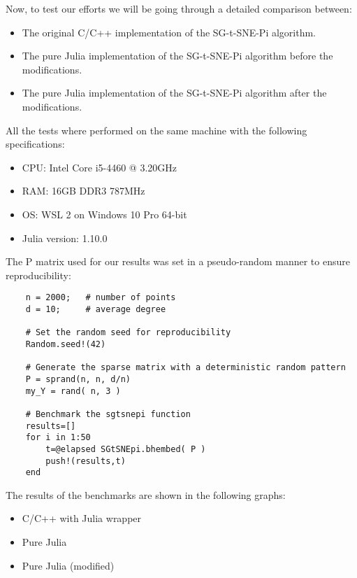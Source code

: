 Now, to test our efforts we will be going through a detailed comparison between:
\begin{itemize}
    \item The original C/C++ implementation of the SG-t-SNE-Pi algorithm.
    \item The pure Julia implementation of the SG-t-SNE-Pi algorithm before the modifications.
    \item The pure Julia implementation of the SG-t-SNE-Pi algorithm after the modifications.
\end{itemize}
All the tests where performed on the same machine with the following specifications:
\begin{itemize}
    \item CPU: Intel Core i5-4460 @ 3.20GHz
    \item RAM: 16GB DDR3 787MHz
    \item OS: WSL 2 on Windows 10 Pro 64-bit
    \item Julia version: 1.10.0
\end{itemize}
The P matrix used for our results was set in a pseudo-random manner to ensure reproducibility:
\begin{verbatim} 
    n = 2000;   # number of points
    d = 10;     # average degree
    
    # Set the random seed for reproducibility
    Random.seed!(42)
    
    # Generate the sparse matrix with a deterministic random pattern
    P = sprand(n, n, d/n)
    my_Y = rand( n, 3 )

    # Benchmark the sgtsnepi function
    results=[]
    for i in 1:50
        t=@elapsed SGtSNEpi.bhembed( P )
        push!(results,t)
    end
\end{verbatim}
The results of the benchmarks are shown in the following graphs:
\begin{itemize}
    \item C/C++ with Julia wrapper

    \item Pure Julia 

    \item Pure Julia (modified)

\end{itemize}
